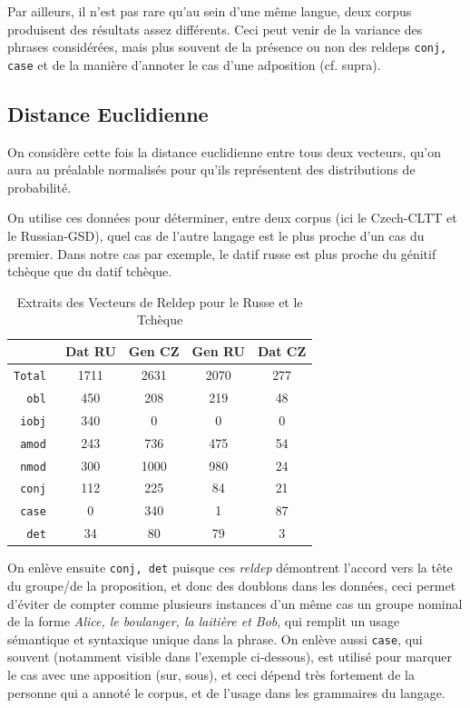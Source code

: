 \documentclass{cours}
\begin{document}
Par ailleurs, il n'est pas rare qu'au sein d'une même langue, deux corpus produisent des résultats assez différents. Ceci peut venir de la variance des phrases considérées, mais plus souvent de la présence ou non des reldeps \texttt{conj, case} et de la manière d'annoter le cas d'une adposition (cf. supra).

\subsection{Distance Euclidienne}\label{subsec:l2}
On considère cette fois la distance euclidienne entre tous deux vecteurs, qu'on aura au préalable normalisés pour qu'ils représentent des distributions de probabilité.



On utilise ces données pour déterminer, entre deux corpus (ici le Czech-CLTT et le Russian-GSD), quel cas de l'autre langage est le plus proche d'un cas du premier.
Dans notre cas par exemple, le datif russe est plus proche du génitif tchèque que du datif tchèque.

\begin{table}[H]
	\centering
	\begin{tabular}{>{\tt}r|cccc}
		\toprule
		&Dat RU & Gen CZ & Gen RU & Dat CZ\\
		\midrule
		Total & 1711 & 2631 & 2070 & 277\\
		obl & 450 & 208 & 219 & 48\\
		iobj & 340 & 0 & 0 & 0\\
		amod & 243 & 736 & 475 & 54\\
		nmod & 300 & 1000 & 980 & 24\\
		conj & 112 & 225 & 84 & 21\\
		case & 0 & 340 & 1 & 87\\
		det & 34 & 80 & 79 & 3\\
		\bottomrule
	\end{tabular}
	\caption{Extraits des Vecteurs de Reldep pour le Russe et le Tchèque}
\end{table}

On enlève ensuite \texttt{conj, det} puisque ces \textit{reldep} démontrent l'accord vers la tête du groupe/de la proposition, et donc des doublons dans les données, ceci permet d'éviter de compter comme plusieurs instances d'un même cas un groupe nominal de la forme \emph{Alice, le boulanger, la laitière et Bob}, qui remplit un usage sémantique et syntaxique unique dans la phrase.
On enlève aussi \texttt{case}, qui souvent (notamment visible dans l'exemple ci-dessous), est utilisé pour marquer le cas avec une apposition (sur, sous), et ceci dépend très fortement de la personne qui a annoté le corpus, et de l'usage dans les grammaires du langage.\\
\medskip
\end{document}
